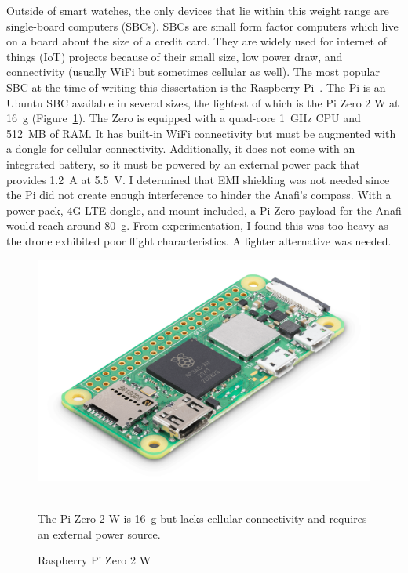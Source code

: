 Outside of smart watches, the only devices that lie within this weight range are single-board computers (SBCs). SBCs are small form factor computers which live on a board about the size of a credit card. They are widely used for internet of things (IoT) projects because of their small size, low power draw, and connectivity (usually WiFi but sometimes cellular as well). The most popular SBC at the time of writing this dissertation is the Raspberry Pi~\cite{RaspberryPi}. The Pi is an Ubuntu SBC available in several sizes, the lightest of which is the Pi Zero 2 W at 16~g (Figure~\ref{fig:pi-zero}). The Zero is equipped with a quad-core 1~GHz CPU and 512~MB of RAM. It has built-in WiFi connectivity but must be augmented with a dongle for cellular connectivity. Additionally, it does not come with an integrated battery, so it must be powered by an external power pack that provides 1.2~A at 5.5~V. I determined that EMI shielding was not needed since the Pi did not create enough interference to hinder the Anafi's compass. With a power pack, 4G LTE dongle, and mount included, a Pi Zero payload for the Anafi would reach around 80~g. From experimentation, I found this was too heavy as the drone exhibited poor flight characteristics. A lighter alternative was needed.

\begin{figure}
    \centering
    \includegraphics[width=0.4\linewidth]{chapter5/FIGS/zero2.png}
    \begin{captext}
    \small \\[0.1cm] The Pi Zero 2 W is 16~g but lacks cellular connectivity and requires an external power source. 
    \end{captext}
    \caption{Raspberry Pi Zero 2 W~\cite{RaspberryPi}}
    \label{fig:pi-zero}
\end{figure}

